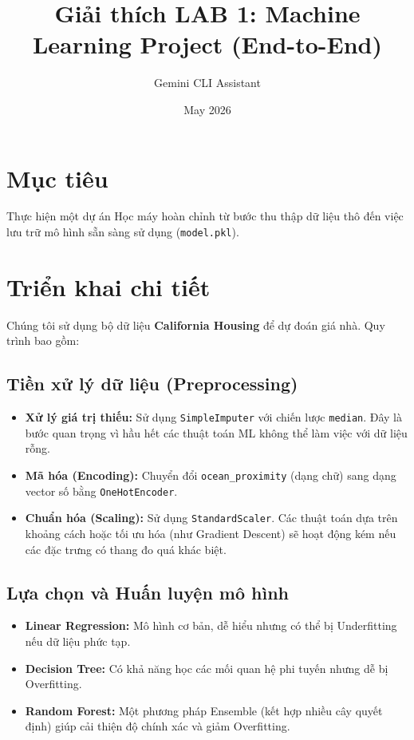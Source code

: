 \documentclass{article}
\title{Giải thích LAB 1: Machine Learning Project (End-to-End)}
\author{Gemini CLI Assistant}
\date{May 2026}
\begin{document}
\maketitle

\section{Mục tiêu}
Thực hiện một dự án Học máy hoàn chỉnh từ bước thu thập dữ liệu thô đến việc lưu trữ mô hình sẵn sàng sử dụng (\texttt{model.pkl}).

\section{Triển khai chi tiết}
Chúng tôi sử dụng bộ dữ liệu \textbf{California Housing} để dự đoán giá nhà. Quy trình bao gồm:

\subsection{Tiền xử lý dữ liệu (Preprocessing)}
\begin{itemize}
    \item \textbf{Xử lý giá trị thiếu:} Sử dụng \texttt{SimpleImputer} với chiến lược \texttt{median}. Đây là bước quan trọng vì hầu hết các thuật toán ML không thể làm việc với dữ liệu rỗng.
    \item \textbf{Mã hóa (Encoding):} Chuyển đổi \texttt{ocean\_proximity} (dạng chữ) sang dạng vector số bằng \texttt{OneHotEncoder}.
    \item \textbf{Chuẩn hóa (Scaling):} Sử dụng \texttt{StandardScaler}. Các thuật toán dựa trên khoảng cách hoặc tối ưu hóa (như Gradient Descent) sẽ hoạt động kém nếu các đặc trưng có thang đo quá khác biệt.
\end{itemize}

\subsection{Lựa chọn và Huấn luyện mô hình}
\begin{itemize}
    \item \textbf{Linear Regression:} Mô hình cơ bản, dễ hiểu nhưng có thể bị Underfitting nếu dữ liệu phức tạp.
    \item \textbf{Decision Tree:} Có khả năng học các mối quan hệ phi tuyến nhưng dễ bị Overfitting.
    \item \textbf{Random Forest:} Một phương pháp Ensemble (kết hợp nhiều cây quyết định) giúp cải thiện độ chính xác và giảm Overfitting.
\end{itemize}
\end{document}
